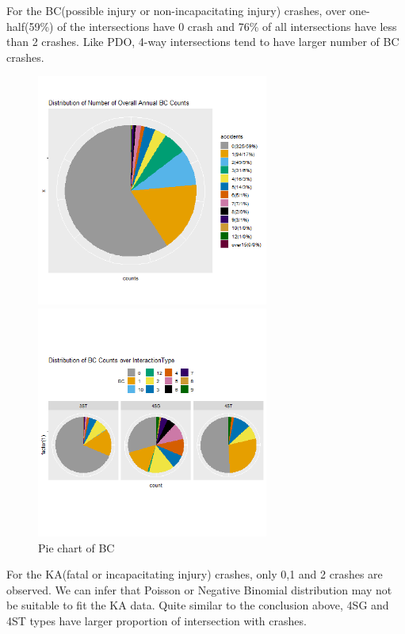 \documentclass[11pt]{scrartcl} %
\begin{document}
For the BC(possible injury or non-incapacitating injury) crashes, over one-half(59\%) of the intersections have 0 crash and 76\% of all intersections have less than 2 crashes. Like PDO, 4-way intersections tend to have larger number of BC crashes.

\begin{figure}[H]
\begin{minipage}[t]{0.5\linewidth}
\centering
\includegraphics[width=3in]{image/p113.png}
\small
\end{minipage}
\begin{minipage}[t]{0.5\linewidth}
\centering
\includegraphics[width=3in]{image/p121_BC.png}
\small
\end{minipage}
\caption{Pie chart of BC}
\end{figure}

For the KA(fatal or incapacitating injury) crashes, only 0,1 and 2 crashes are observed. We can infer that Poisson or Negative Binomial distribution may not be suitable to fit the KA data. Quite similar to the conclusion above, 4SG and 4ST types have larger proportion of intersection with crashes.
\end{document}

